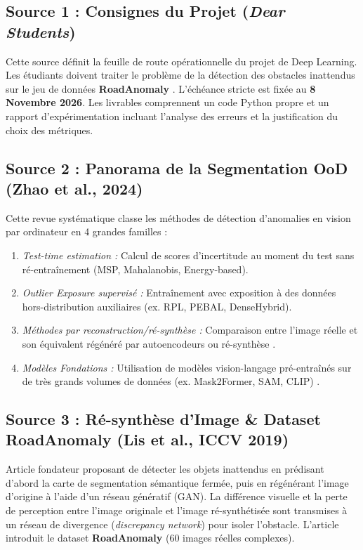 \documentclass[11pt,a4paper]{article} \usepackage[utf8]{inputenc} \usepackage[T1]{fontenc}
\begin{document}
\subsection{Source 1 : Consignes du Projet (\emph{Dear Students}) \cite{assignment2026}}
Cette source définit la feuille de route opérationnelle du projet de Deep Learning. Les étudiants doivent
traiter le problème de la détection des obstacles inattendus sur le jeu de données \textbf{RoadAnomaly}
\cite{lis2019detecting}. L'échéance stricte est fixée au \textbf{8 Novembre 2026}. Les livrables
comprennent un code Python propre et un rapport d'expérimentation incluant l'analyse des erreurs et la
justification du choix des métriques.
\subsection{Source 2 : Panorama de la Segmentation OoD (Zhao et al., 2024) \cite{zhao2024survey}}
Cette revue systématique classe les méthodes de détection d'anomalies en vision par ordinateur en 4
grandes familles :
\begin{enumerate} \item \emph{Test-time estimation :} Calcul de scores d'incertitude au moment du test
sans ré-entraînement (MSP, Mahalanobis, Energy-based). \item \emph{Outlier Exposure supervisé :}
Entraînement avec exposition à des données hors-distribution auxiliaires (ex. RPL, PEBAL, DenseHybrid).
\item \emph{Méthodes par reconstruction/ré-synthèse :} Comparaison entre l'image réelle et son équivalent
régénéré par autoencodeurs \cite{toyota2024} ou ré-synthèse \cite{lis2019detecting}. \item \emph{Modèles
Fondations :} Utilisation de modèles vision-langage pré-entraînés sur de très grands volumes de données
(ex. Mask2Former, SAM, CLIP) \cite{s2m2024}.
\end{enumerate}
\subsection{Source 3 : Ré-synthèse d'Image \& Dataset RoadAnomaly (Lis et al., ICCV 2019) \cite{lis2019detecting}}
Article fondateur proposant de détecter les objets inattendus en prédisant d'abord la carte de
segmentation sémantique fermée, puis en régénérant l'image d'origine à l'aide d'un réseau génératif
(GAN). La différence visuelle et la perte de perception entre l'image originale et l'image ré-synthétisée
sont transmises à un réseau de divergence (\emph{discrepancy network}) pour isoler l'obstacle. L'article
introduit le dataset \textbf{RoadAnomaly} (60 images réelles complexes).
\end{document}
